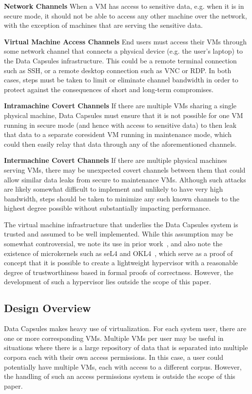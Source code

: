 \documentclass{acm_proc_article-sp}
\begin{document}
\textbf{Network Channels} When a VM has access to sensitive data, e.g. when it
is in secure mode, it should not be able to access any other machine over the
network, with the exception of machines that are serving the sensitive data.

\textbf{Virtual Machine Access Channels} End users must access their VMs
through some network channel that connects a physical device (e.g. the user's
laptop) to the Data Capsules infrastructure.  This could be a remote terminal
connection such as SSH, or a remote desktop connection such as VNC or RDP.  In
both cases, steps must be taken to limit or eliminate channel bandwidth in order
to protect against the consequences of short and long-term compromises.

\textbf{Intramachine Covert Channels} If there are multiple VMs sharing a
single physical machine, Data Capsules must ensure that it is not possible for
one VM running in secure mode (and hence with access to sensitive data) to then
leak that data to a separate coresident VM running in maintenance mode, which
could then easily relay that data through any of the aforementioned channels.

\textbf{Intermachine Covert Channels} If there are multiple physical machines
serving VMs, there may be unexpected covert channels between them that could
allow similar data leaks from secure to maintenance VMs.  Although such attacks
are likely somewhat difficult to implement and unlikely to have very high
bandwidth, steps should be taken to minimize any such known channels to the
highest degree possible without substantially impacting performance.

The virtual machine infrastructure that underlies the Data Capsules system is
trusted and assumed to be well implemented.  While this assumption may be
somewhat controversial, we note its use in prior work~\cite{capsules}, and also
note the existence of microkernels such as seL4 and OKL4~\cite{sel4, OKL4},
which serve as a proof of concept that it is possible to create a lightweight
hypervisor with a reasonable degree of trustworthiness based in formal proofs
of correctness.  However, the development of such a hypervisor lies outside the
scope of this paper.

\subsection{Design Overview}

Data Capsules makes heavy use of virtualization.  For each system user, there
are one or more corresponding VMs.  Multiple VMs per user may be useful in
situations where there is a large repository of data that is separated into
multiple corpora each with their own access permissions.  In this case, a user
could potentially have multiple VMs, each with access to a different corpus.
However, the handling of such an access permissions system is outside the scope
of this paper.
\end{document}
